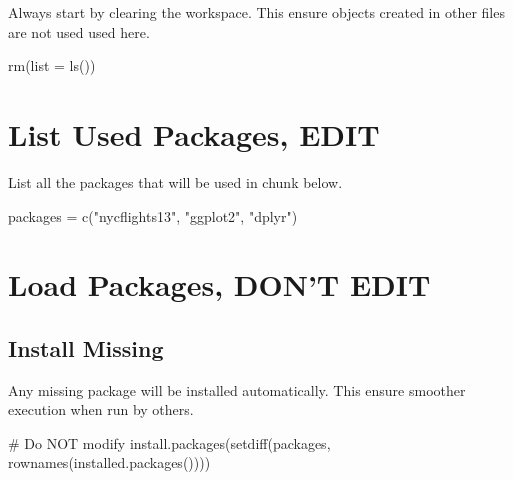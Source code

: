 \documentclass[
  letterpaper,
  DIV=11,
  numbers=noendperiod]{scrreprt}
\newenvironment{Shaded}{\begin{snugshade}}{\end{snugshade}}
\newcommand{\AttributeTok}[1]{\textcolor[rgb]{0.40,0.45,0.13}{#1}}
\newcommand{\CommentTok}[1]{\textcolor[rgb]{0.37,0.37,0.37}{#1}}
\newcommand{\FunctionTok}[1]{\textcolor[rgb]{0.28,0.35,0.67}{#1}}
\newcommand{\NormalTok}[1]{\textcolor[rgb]{0.00,0.23,0.31}{#1}}
\newcommand{\OtherTok}[1]{\textcolor[rgb]{0.00,0.23,0.31}{#1}}
\newcommand{\StringTok}[1]{\textcolor[rgb]{0.13,0.47,0.30}{#1}}
\begin{document}

Always start by clearing the workspace. This ensure objects created in
other files are not used used here.

\begin{Shaded}
\begin{Highlighting}[]
\FunctionTok{rm}\NormalTok{(}\AttributeTok{list =} \FunctionTok{ls}\NormalTok{())}
\end{Highlighting}
\end{Shaded}

\section*{List Used Packages, EDIT}\label{list-used-packages-edit-5}


List all the packages that will be used in chunk below.

\begin{Shaded}
\begin{Highlighting}[]
\NormalTok{packages }\OtherTok{=} \FunctionTok{c}\NormalTok{(}\StringTok{"nycflights13"}\NormalTok{, }\StringTok{"ggplot2"}\NormalTok{, }\StringTok{"dplyr"}\NormalTok{)}
\end{Highlighting}
\end{Shaded}

\section*{Load Packages, DON'T EDIT}\label{sec-packages}


\subsection*{Install Missing}\label{install-missing-5}

Any missing package will be installed automatically. This ensure
smoother execution when run by others.

\begin{Shaded}
\begin{Highlighting}[]
\CommentTok{\# Do NOT modify}
\FunctionTok{install.packages}\NormalTok{(}\FunctionTok{setdiff}\NormalTok{(packages, }\FunctionTok{rownames}\NormalTok{(}\FunctionTok{installed.packages}\NormalTok{())))}
\end{Highlighting}
\end{Shaded}
\end{document}
